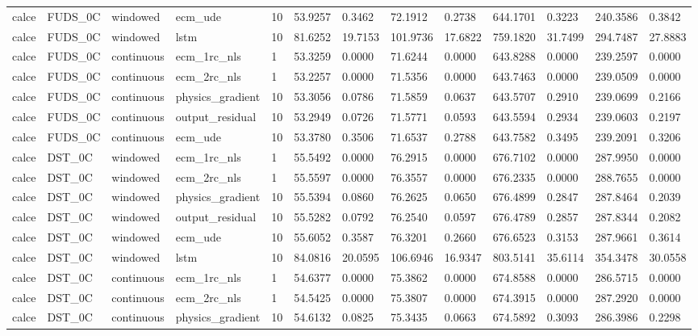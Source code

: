 \begin{tabular}{lllllllllllll}
calce & FUDS\_0C & windowed & ecm\_ude & 10 & 53.9257 & 0.3462 & 72.1912 & 0.2738 & 644.1701 & 0.3223 & 240.3586 & 0.3842 \\
calce & FUDS\_0C & windowed & lstm & 10 & 81.6252 & 19.7153 & 101.9736 & 17.6822 & 759.1820 & 31.7499 & 294.7487 & 27.8883 \\
calce & FUDS\_0C & continuous & ecm\_1rc\_nls & 1 & 53.3259 & 0.0000 & 71.6244 & 0.0000 & 643.8288 & 0.0000 & 239.2597 & 0.0000 \\
calce & FUDS\_0C & continuous & ecm\_2rc\_nls & 1 & 53.2257 & 0.0000 & 71.5356 & 0.0000 & 643.7463 & 0.0000 & 239.0509 & 0.0000 \\
calce & FUDS\_0C & continuous & physics\_gradient & 10 & 53.3056 & 0.0786 & 71.5859 & 0.0637 & 643.5707 & 0.2910 & 239.0699 & 0.2166 \\
calce & FUDS\_0C & continuous & output\_residual & 10 & 53.2949 & 0.0726 & 71.5771 & 0.0593 & 643.5594 & 0.2934 & 239.0603 & 0.2197 \\
calce & FUDS\_0C & continuous & ecm\_ude & 10 & 53.3780 & 0.3506 & 71.6537 & 0.2788 & 643.7582 & 0.3495 & 239.2091 & 0.3206 \\
calce & DST\_0C & windowed & ecm\_1rc\_nls & 1 & 55.5492 & 0.0000 & 76.2915 & 0.0000 & 676.7102 & 0.0000 & 287.9950 & 0.0000 \\
calce & DST\_0C & windowed & ecm\_2rc\_nls & 1 & 55.5597 & 0.0000 & 76.3557 & 0.0000 & 676.2335 & 0.0000 & 288.7655 & 0.0000 \\
calce & DST\_0C & windowed & physics\_gradient & 10 & 55.5394 & 0.0860 & 76.2625 & 0.0650 & 676.4899 & 0.2847 & 287.8464 & 0.2039 \\
calce & DST\_0C & windowed & output\_residual & 10 & 55.5282 & 0.0792 & 76.2540 & 0.0597 & 676.4789 & 0.2857 & 287.8344 & 0.2082 \\
calce & DST\_0C & windowed & ecm\_ude & 10 & 55.6052 & 0.3587 & 76.3201 & 0.2660 & 676.6523 & 0.3153 & 287.9661 & 0.3614 \\
calce & DST\_0C & windowed & lstm & 10 & 84.0816 & 20.0595 & 106.6946 & 16.9347 & 803.5141 & 35.6114 & 354.3478 & 30.0558 \\
calce & DST\_0C & continuous & ecm\_1rc\_nls & 1 & 54.6377 & 0.0000 & 75.3862 & 0.0000 & 674.8588 & 0.0000 & 286.5715 & 0.0000 \\
calce & DST\_0C & continuous & ecm\_2rc\_nls & 1 & 54.5425 & 0.0000 & 75.3807 & 0.0000 & 674.3915 & 0.0000 & 287.2920 & 0.0000 \\
calce & DST\_0C & continuous & physics\_gradient & 10 & 54.6132 & 0.0825 & 75.3435 & 0.0663 & 674.5892 & 0.3093 & 286.3986 & 0.2298 \\

\end{tabular}
